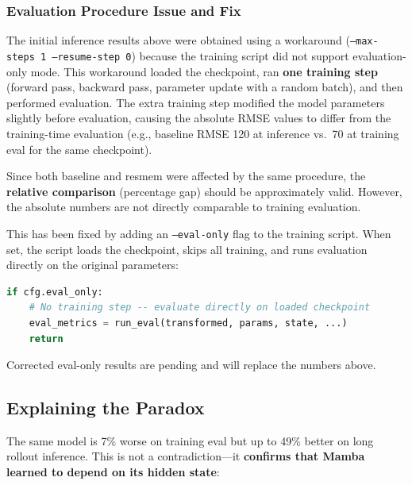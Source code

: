 \documentclass[11pt,a4paper]{article}
\begin{document}
\subsubsection{Evaluation Procedure Issue and Fix}

The initial inference results above were obtained using a workaround (\texttt{--max-steps 1 --resume-step 0}) because the training script did not support evaluation-only mode. This workaround loaded the checkpoint, ran \textbf{one training step} (forward pass, backward pass, parameter update with a random batch), and then performed evaluation. The extra training step modified the model parameters slightly before evaluation, causing the absolute RMSE values to differ from the training-time evaluation (e.g., baseline RMSE 120 at inference vs.\ 70 at training eval for the same checkpoint).

Since both baseline and resmem were affected by the same procedure, the \textbf{relative comparison} (percentage gap) should be approximately valid. However, the absolute numbers are not directly comparable to training evaluation.

This has been fixed by adding an \texttt{--eval-only} flag to the training script. When set, the script loads the checkpoint, skips all training, and runs evaluation directly on the original parameters:

\begin{lstlisting}[language=Python]
if cfg.eval_only:
    # No training step -- evaluate directly on loaded checkpoint
    eval_metrics = run_eval(transformed, params, state, ...)
    return
\end{lstlisting}

Corrected eval-only results are pending and will replace the numbers above.

\subsection{Explaining the Paradox}

The same model is 7\% worse on training eval but up to 49\% better on long rollout inference. This is not a contradiction---it \textbf{confirms that Mamba learned to depend on its hidden state}:
\end{document}
